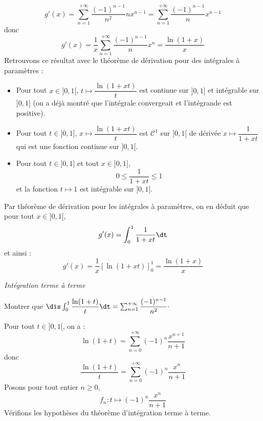 \documentclass[a4paper,10pt]{report}
\begin{document}
\begin{enumerate}
$$g'(x) =  \sum_{n=1}^{+ \infty} \dfrac{(-1)^{n-1}}{n^2} nx^{n-1} = \sum_{n=1}^{+ \infty} \dfrac{(-1)^{n-1}}{n} x^{n-1}$$
donc 
$$ g'(x) = \dfrac{1}{x} \sum_{n=1}^{+ \infty} \dfrac{(-1)^{n-1}}{n} x^{n} = \dfrac{\ln(1+x)}{x}$$
Retrouvons ce résultat avec le théorème de dérivation pour des intégrales à paramètres :
\begin{itemize}
\item Pour tout $x \in ]0,1[$, $t \mapsto \dfrac{\ln(1+xt)}{t}$ est continue sur $]0,1]$ et intégrable sur $]0,1]$ (on a déjà montré que l'intégrale convergeait et l'intégrande est positive).
\item Pour tout $t \in ]0,1]$, $x \mapsto \dfrac{\ln(1+xt)}{t}$ est $\mathcal{C}^1$ sur $]0,1[$ de dérivée $x \mapsto \dfrac{1}{1+xt}$ qui est une fonction continue sur $]0,1[$.
\item Pour tout $t \in ]0,1]$ et tout $x \in ]0,1]$,
$$ 0 \leq \dfrac{1}{1+xt} \leq 1$$
et la fonction $t \mapsto 1$ est intégrable sur $]0,1]$.
\end{itemize}
Par théorème de dérivation pour les intégrales à paramètres, on en déduit que pour tout $x \in ]0,1[$,
$$ g'(x) = \int_{0}^1 \dfrac{1}{1+xt} \dt$$
et ainsi :
$$ g'(x) = \dfrac{1}{x} [ \ln(1+xt) ]_0^1 = \dfrac{\ln(1+x)}{x}$$
\end{enumerate}
\medskip

\begin{center}
\textit{{ {\large Intégration terme à terme}}}
\end{center}

\medskip

\begin{Exa} Montrer que $\dis \int_{0}^1 \dfrac{\ln(1+t)}{t}\dt = \sum_{n=1}^{+ \infty} \dfrac{(-1)^{n-1}}{n^2} \cdot$
\end{Exa}

\corr Pour tout $t \in ]0,1[$, on a :
$$ \ln(1+t) = \sum_{n=0}^{+ \infty} (-1)^{n} \dfrac{x^{n+1}}{n+1}$$
donc
$$ \dfrac{\ln(1+t)}{t} = \sum_{n=0}^{+ \infty} (-1)^{n} \dfrac{x^{n}}{n+1}$$
Posons pour tout entier $n \geq 0$,
$$ f_n : t \mapsto (-1)^{n} \dfrac{x^{n}}{n+1}$$
Vérifions les hypothèses du théorème d'intégration terme à terme.
\end{document}

